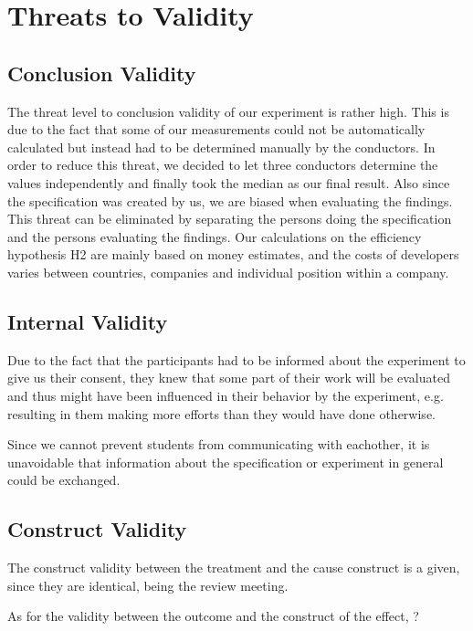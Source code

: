 \section{Threats to Validity}

\subsection{Conclusion Validity}

The threat level to conclusion validity of our experiment is rather high. This is due to the fact
that some of our measurements could not be automatically calculated but instead had to be determined
manually by the conductors. In order to reduce this threat, we decided to let three conductors
determine the values independently and finally took the median as our final result.
Also since the specification was created by us, we are biased when evaluating the findings. This threat can be eliminated by separating the persons doing the specification and the persons evaluating the findings.
Our calculations on the efficiency hypothesis H2 are mainly based on money estimates, and the costs of developers varies between countries, companies and individual position within a company.

\subsection{Internal Validity}

Due to the fact that the participants had to be informed about the experiment to give us their
consent, they knew that some part of their work will be evaluated and thus might have been
influenced in their behavior by the experiment, e.g. resulting in them making more efforts than they would have done otherwise.

Since we cannot prevent students from communicating with eachother, it is unavoidable that information about the specification or experiment in general could be exchanged.

\subsection{Construct Validity}

The construct validity between the treatment and the cause construct is a given, since they are identical, being the review meeting.

As for the validity between the outcome and the construct of the effect, ?

